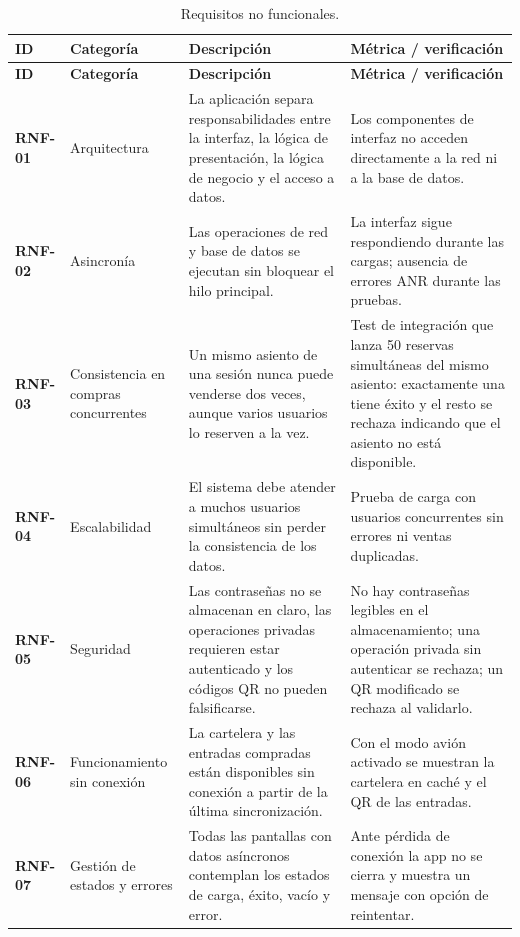 \documentclass[11pt,a4paper]{article}
\begin{document}
\begin{longtable}{L{1.6cm} L{2.8cm} L{5.0cm} L{4.6cm}}
\caption{Requisitos no funcionales.}\label{tab:rnf}\\
\toprule
\textbf{ID} & \textbf{Categoría} & \textbf{Descripción} & \textbf{Métrica / verificación} \\
\midrule
\endfirsthead
\toprule
\textbf{ID} & \textbf{Categoría} & \textbf{Descripción} & \textbf{Métrica / verificación} \\
\midrule
\endhead
\bottomrule
\endlastfoot

\textbf{RNF-01} & Arquitectura & La aplicación separa responsabilidades entre la interfaz, la lógica de presentación, la lógica de negocio y el acceso a datos. & Los componentes de interfaz no acceden directamente a la red ni a la base de datos. \\
\midrule
\textbf{RNF-02} & Asincronía & Las operaciones de red y base de datos se ejecutan sin bloquear el hilo principal. & La interfaz sigue respondiendo durante las cargas; ausencia de errores ANR durante las pruebas. \\
\midrule
\textbf{RNF-03} & Consistencia en compras concurrentes & Un mismo asiento de una sesión nunca puede venderse dos veces, aunque varios usuarios lo reserven a la vez. & Test de integración que lanza 50 reservas simultáneas del mismo asiento: exactamente una tiene éxito y el resto se rechaza indicando que el asiento no está disponible. \\
\midrule
\textbf{RNF-04} & Escalabilidad & El sistema debe atender a muchos usuarios simultáneos sin perder la consistencia de los datos. & Prueba de carga con usuarios concurrentes sin errores ni ventas duplicadas. \\
\midrule
\textbf{RNF-05} & Seguridad & Las contraseñas no se almacenan en claro, las operaciones privadas requieren estar autenticado y los códigos QR no pueden falsificarse. & No hay contraseñas legibles en el almacenamiento; una operación privada sin autenticar se rechaza; un QR modificado se rechaza al validarlo. \\
\midrule
\textbf{RNF-06} & Funcionamiento sin conexión & La cartelera y las entradas compradas están disponibles sin conexión a partir de la última sincronización. & Con el modo avión activado se muestran la cartelera en caché y el QR de las entradas. \\
\midrule
\textbf{RNF-07} & Gestión de estados y errores & Todas las pantallas con datos asíncronos contemplan los estados de carga, éxito, vacío y error. & Ante pérdida de conexión la app no se cierra y muestra un mensaje con opción de reintentar. \\

\end{longtable}
\end{document}
